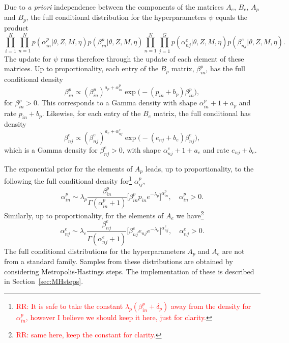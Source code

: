\documentclass[11pt]{amsart}
\theoremstyle{definition}
\theoremstyle{remark}
\begin{document}
Due to \emph{a priori} independence between the
components of the matrices $A_e$, $B_e$, $A_p$ and $B_p$, the full
conditional distribution for the hyperparameters $\psi$ equals the
product
\[
   \prod_{i=1}^K\prod_{n=1}^N
     p(\alpha_{in}^p| \theta, Z, M, \eta)
     p(\beta_{in}^p|\theta, Z, M, \eta)
   \prod_{n=1}^N\prod_{j=1}^G
     p(\alpha_{nj}^e|\theta, Z, M, \eta)
     p(\beta_{nj}^e|\theta, Z, M, \eta).
\]
The update for $\psi$ runs therefore through the update of each
element of these matrices. Up to proportionality, each entry of the
$B_p$ matrix, $\beta_{in}^p$,  has the full conditional density
\begin{equation}
 \label{eqn:Full_for_Bp}
 \beta_{in}^p
   \propto
   (\beta_{in}^p)^{a_p + \alpha_{in}^p} 
   \exp\Big(-(p_{in}+b_p)\beta_{in}^p\Big),\tag{$s_4$}
\end{equation}
for $\beta_{in}^p > 0$. This corresponds to a Gamma density with shape
$\alpha_{in}^p + 1 + a_p$ and rate $p_{in} + b_p$.  Likewise, for each
entry of the $B_e$ matrix, the full conditional has density 
\begin{equation}
 \label{eqn:Full_for_Be}
 \beta_{nj}^e
   \propto
  (\beta_{nj}^e)^{a_e + \alpha_{nj}^e} 
  \exp\Big(-(e_{nj}+b_e)\beta_{nj}^e\Big),\tag{$s_5$}
\end{equation}
which is a  Gamma density for $\beta_{nj}^e > 0$, with shape
$\alpha_{nj}^e + 1+ a_e$ and rate $e_{nj}+b_e$. 


The exponential prior for the elements of $A_p$ leads, up to
proportionality, to the following the full conditional density
for\footnote{\textcolor{red}{RR: It is safe to take the constant $\lambda_p(\beta_{in}^p
    + \delta_p)$ away from the density for $\alpha_{in}^p$, however I believe we should keep it here, just for clarity.}}
$\alpha_{ij}^p$,
\begin{equation}
 \label{eqn:Full_for_Ap}
  \alpha_{in}^p 
  \sim 
  \lambda_p\frac{\beta_{in}^p}{\Gamma(\alpha_{in}^p + 1)} 
   \Big[\beta_{in}^pp_{in}
   e^{-\lambda_p}\Big]^{\alpha_{in}^p}, \tag{$s_6$}
   \quad  \alpha_{in}^p > 0.
\end{equation}
Similarly, up to proportionality, for the elements of $A_e$ we
have\footnote{\textcolor{red}{RR: same here, keep the
    constant for clarity.}}
\begin{equation}
 \label{eqn:Full_for_Ae}
  \alpha_{nj}^e 
  \sim
  \lambda_e\frac{\beta_{nj}^e}{\Gamma(\alpha_{nj}^e + 1)} 
   \Big[\beta_{nj}^e e_{nj}
   e^{-\lambda_e}\Big]^{\alpha_{nj}^e}, 
   \quad  \alpha_{nj}^e > 0. \tag{$s_7$}
\end{equation}
The full conditional distributions for the hyperparameters $A_p$ and
$A_e$ are not from a standard family. Samples from these distributions
are obtained by considering Metropolis-Hastings steps. The
implementation of these is described in Section~\ref{sec:MHsteps}.
\end{document}

